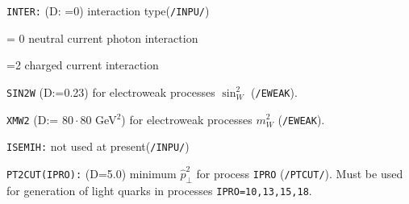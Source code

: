 \documentclass[10pt]{article} \usepackage{dina4}
\newcommand{\deflab}[1]{#1\hfil}%
\newenvironment{defl}[1]%
  {\begin{list}{}{\settowidth{\labelwidth}{#1}%
  \setlength{\leftmargin}{\labelwidth}%
  \addtolength{\leftmargin}{\labelsep}%
  \setlength{\itemsep}{0pt plus 1pt}
  \setlength{\parsep}{0pt plus 1pt}
  \setlength{\topsep}{0pt plus 1pt}
  \setlength{\partopsep}{0pt plus 1pt}
  \setlength{\parskip}{2mm plus 1mm minus 1mm}
  \let\makelabel\deflab}}%
  {\end{list}}
\begin{document}
\begin{defl}{123456789012345}
\item[{\tt INTER:}] (D: =0) interaction type(\verb+/INPU/+)
\item[             ] = 0 neutral current photon interaction
\item[             ] =2 charged current interaction
\item[{\tt SIN2W}] (D:=0.23) for electroweak processes 
                   $\sin ^2_W$ (\verb+/EWEAK+). 
\item[{\tt XMW2}]
 (D:= $80 \cdot 80$ GeV$^2$) for electroweak processes  $m_W^2$ 
                   (\verb+/EWEAK+).


\item[{\tt ISEMIH:}] not used at present(\verb+/INPU/+)

\item[{\tt PT2CUT(IPRO):}]
 (D=5.0) minimum $\hat{p}^2 _{\perp}$ for
                            process \verb+IPRO+ (\verb+/PTCUT/+).
                            Must be used for generation of light quarks
                            in processes \verb+IPRO=10,13,15,18+.
                            

\end{defl}
\end{document}
